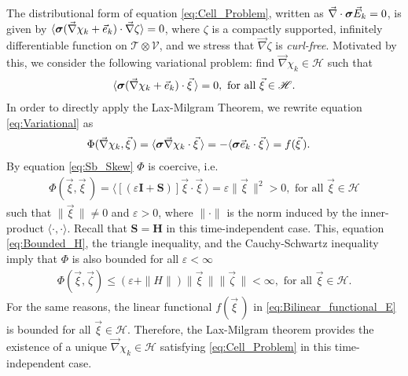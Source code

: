 \documentclass[11pt]{amsart}
\newcommand{\Hb}{\mathbf{H}}
\newcommand{\Ib}{\mathbf{I}}
\newcommand{\Sb}{\mathbf{S}}
\newcommand{\Tc}{\mathcal{T}}
\newcommand{\Vc}{\mathcal{V}}
\newcommand{\Hs}{\mathscr{H}}
\newcommand\bsig{\mbox{\boldmath${\sigma}$}}
\begin{document}
The distributional form of equation \eqref{eq:Cell_Problem}, written
as $\vec{\nabla}\cdot\bsig\vec{E}_k=0$, is given by
$\langle\bsig(\vec{\nabla}\chi_k+\vec{e}_k)\cdot\vec{\nabla}\zeta\rangle=0$, where $\zeta$ is a compactly
supported, infinitely differentiable function on $\Tc\otimes\Vc$, and we
stress that $\vec{\nabla}\zeta$ is \emph{curl-free}. Motivated by this, we
consider the following variational problem: find $\vec{\nabla}\chi_k\in\Hs$ such
that   
%
\begin{align}\label{eq:Variational}
  \langle\bsig(\vec{\nabla}\chi_k+\vec{e}_k)\cdot\vec{\xi}\,\rangle=0, \text{ for all }
  \vec{\xi}\in\Hs.
\end{align}
%
In order to directly apply the Lax-Milgram Theorem, we rewrite
equation \eqref{eq:Variational} as 
%
\begin{align}  \label{eq:Bilinear_functional_E} 
   &\Phi(\vec{\nabla}\chi_k,\vec{\xi}\,)
     =\langle\bsig\vec{\nabla}\chi_k\cdot\vec{\xi}\,\rangle
     =-\langle\bsig\vec{e}_k\cdot\vec{\xi}\,\rangle
     =f(\vec{\xi}\,). 
\end{align}
%
By equation \eqref{eq:Sb_Skew} $\Phi$ is coercive, i.e.
%
\begin{align}\label{eq:Phi_Coercive}
  \Phi(\vec{\xi},\vec{\xi}\,)=\langle[(\varepsilon\Ib+\Sb)]\vec{\xi}\cdot\vec{\xi}\,\rangle=\varepsilon\|\vec{\xi}\,\|^2>0,
   \text{ for all } \vec{\xi}\in\Hs
\end{align}
%
such that $\|\vec{\xi}\,\|\neq0$ and $\varepsilon>0$, where $\|\cdot\|$
is the norm induced by the inner-product $\langle\cdot,\cdot\rangle$. Recall that
$\Sb=\Hb$ in this time-independent case. This, equation 
\eqref{eq:Bounded_H}, the triangle inequality,
and the Cauchy-Schwartz inequality imply that $\Phi$ is also bounded for
all $\varepsilon<\infty$
%
\begin{align}\label{eq:Phi_Bounded}
  \Phi(\vec{\xi},\vec{\zeta})\leq(\varepsilon+\|H\|)\|\vec{\xi}\,\|\|\vec{\zeta}\,\|<\infty,
  \text{ for all } \vec{\xi}\in\Hs.
\end{align}
%
For the same reasons, the linear functional $f(\vec{\xi}\,)$ in
\eqref{eq:Bilinear_functional_E} is bounded for all
$\vec{\xi}\in\Hs$. Therefore, the Lax-Milgram theorem
\cite{McOwen:2003:PDE} provides the existence of a unique
$\vec{\nabla}\chi_k\in\Hs$ satisfying \eqref{eq:Cell_Problem} in this
time-independent case. 
\end{document}
